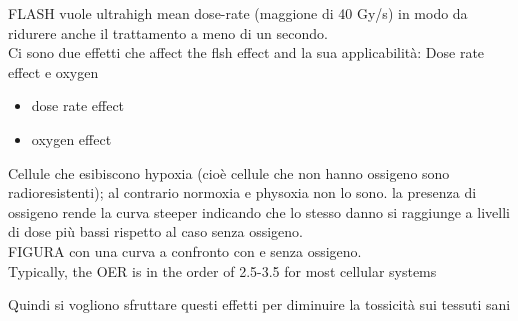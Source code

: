     FLASH vuole ultrahigh mean dose-rate (maggione di 40 Gy/s) in modo da ridurere anche il trattamento a meno di un secondo. \\


    Ci sono due effetti che affect the flsh effect and la sua applicabilità: Dose rate effect e oxygen\\
    \begin{itemize}
        \item dose rate effect
        \item oxygen effect
    \end{itemize}    

    Cellule che esibiscono hypoxia (cioè cellule che non hanno ossigeno sono radioresistenti); al contrario normoxia e physoxia non lo sono.
    la presenza di ossigeno rende la curva steeper indicando che lo stesso danno si raggiunge a livelli di dose più bassi rispetto al caso senza ossigeno.\\
    FIGURA con una curva a confronto con e senza ossigeno.\\
    Typically, the OER is in the order of 2.5-3.5 for most cellular systems


    Quindi si vogliono sfruttare questi effetti per diminuire la tossicità sui tessuti sani\\




